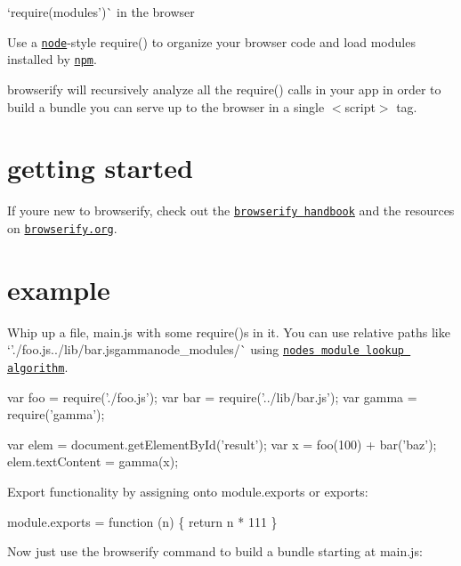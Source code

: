 `require(\textquotesingle{}modules')\`{} in the browser

Use a \href{http://nodejs.org}{\tt node}-\/style {\ttfamily require()} to organize your browser code and load modules installed by \href{https://www.npmjs.com}{\tt npm}.

browserify will recursively analyze all the {\ttfamily require()} calls in your app in order to build a bundle you can serve up to the browser in a single {\ttfamily $<$script$>$} tag.

\href{https://travis-ci.org/browserify/browserify}{\tt }



\section*{getting started}

If you\textquotesingle{}re new to browserify, check out the \href{https://github.com/browserify/browserify-handbook}{\tt browserify handbook} and the resources on \href{http://browserify.org/}{\tt browserify.\+org}.

\section*{example}

Whip up a file, {\ttfamily main.\+js} with some {\ttfamily require()}s in it. You can use relative paths like `'./foo.js\textquotesingle{}../lib/bar.js\textquotesingle{}gammanode\+\_\+modules/\`{} using \href{https://github.com/browserify/resolve}{\tt node\textquotesingle{}s module lookup algorithm}.


\begin{DoxyCode}
var foo = require('./foo.js');
var bar = require('../lib/bar.js');
var gamma = require('gamma');

var elem = document.getElementById('result');
var x = foo(100) + bar('baz');
elem.textContent = gamma(x);
\end{DoxyCode}


Export functionality by assigning onto {\ttfamily module.\+exports} or {\ttfamily exports}\+:


\begin{DoxyCode}
module.exports = function (n) \{ return n * 111 \}
\end{DoxyCode}


Now just use the {\ttfamily browserify} command to build a bundle starting at {\ttfamily main.\+js}\+:


